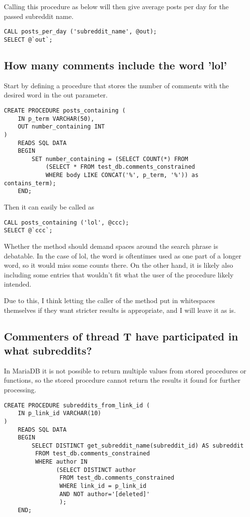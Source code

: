     Calling this procedure as below will then give average posts per day for the passed subreddit name.
    \begin{verbatim}
CALL posts_per_day ('subreddit_name', @out);
SELECT @`out`;
    \end{verbatim}

\subsection{How many comments include the word 'lol'}\label{subsec:how-many-comments-include}

Start by defining a procedure that stores the number of comments with the desired word in the out parameter.

\begin{verbatim}
CREATE PROCEDURE posts_containing (
    IN p_term VARCHAR(50),
    OUT number_containing INT
)
    READS SQL DATA
    BEGIN
        SET number_containing = (SELECT COUNT(*) FROM
            (SELECT * FROM test_db.comments_constrained
            WHERE body LIKE CONCAT('%', p_term, '%')) as contains_term);
    END;
\end{verbatim}

    Then it can easily be called as
    \begin{verbatim}
CALL posts_containing ('lol', @ccc);
SELECT @`ccc`;
    \end{verbatim}

    Whether the method should demand spaces around the search phrase is debatable.
    In the case of lol, the word is oftentimes used as one part of a longer word, so it would miss some counts there.
    On the other hand, it is likely also including some entries that wouldn't fit what the user of the procedure likely intended.

    Due to this, I think letting the caller of the method put in whitespaces themselves if they want stricter results is appropriate, and I will leave it as is.

    \subsection{Commenters of thread T have participated in what subreddits?}\label{subsec:what-subreddits}

    In MariaDB it is not possible to return multiple values from stored procedures or functions, so the stored procedure cannot return the results it found for further processing.

    \begin{verbatim}
CREATE PROCEDURE subreddits_from_link_id (
    IN p_link_id VARCHAR(10)
)
    READS SQL DATA
    BEGIN
        SELECT DISTINCT get_subreddit_name(subreddit_id) AS subreddit
         FROM test_db.comments_constrained
         WHERE author IN
               (SELECT DISTINCT author
                FROM test_db.comments_constrained
                WHERE link_id = p_link_id
                AND NOT author='[deleted]'
                );
    END;
    \end{verbatim}

